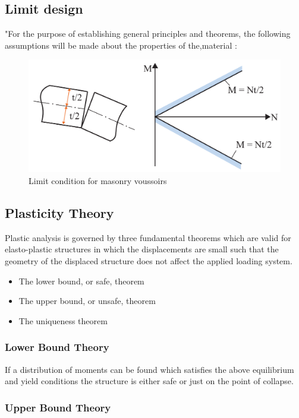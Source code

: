 \subsection{Limit design}

"For the purpose of establishing general principles and theorems, the following
assumptions will be made about the properties of the,material :


\begin{figure}[H]
\centering
\includegraphics[width=0.9\linewidth ]{figure/Theory/Plasticity.pdf}
\caption{Limit condition for masonry voussoirs}
\end{figure}


\subsection{Plasticity Theory}

Plastic analysis is governed by three fundamental theorems which are valid for elasto-plastic structures in which the displacements are small such that the geometry of the displaced structure does not affect the applied loading system.

\begin{itemize}
\item The lower bound, or safe, theorem
\item The upper bound, or unsafe, theorem
\item The uniqueness theorem
\end{itemize}


\subsubsection{Lower Bound Theory}


If a distribution of moments can be found which satisfies the above equilibrium and yield conditions the structure is either safe or just on the point of collapse.
\subsubsection{Upper Bound Theory}


